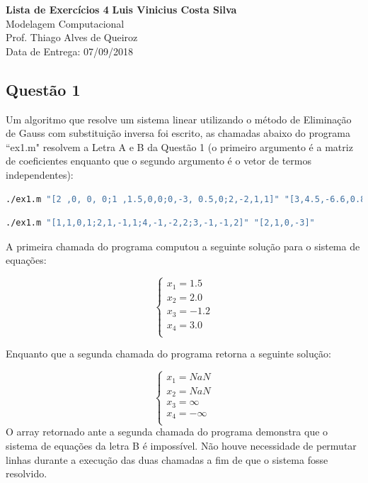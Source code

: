 \documentclass[a4paper, 11pt]{article}
\begin{document}
\noindent
\large\textbf{Lista de Exercícios 4} \hfill \textbf{Luis Vinicius Costa Silva} \\
\normalsize Modelagem Computacional \\
Prof. Thiago Alves de Queiroz \\
\hfill Data de Entrega: 07/09/2018

\subsection*{Questão 1}
Um algoritmo que resolve um sistema linear utilizando o método de Eliminação de Gauss com substituição inversa foi escrito, as chamadas abaixo do programa ``ex1.m" resolvem a Letra A e B da 
Questão 1 (o primeiro argumento é a matriz de coeficientes enquanto que o segundo argumento é o vetor de termos independentes):

\begin{lstlisting}[language=bash]
./ex1.m "[2 ,0, 0, 0;1 ,1.5,0,0;0,-3, 0.5,0;2,-2,1,1]" "[3,4.5,-6.6,0.8]"
\end{lstlisting}

\begin{lstlisting}[language=bash]
./ex1.m "[1,1,0,1;2,1,-1,1;4,-1,-2,2;3,-1,-1,2]" "[2,1,0,-3]"
\end{lstlisting}

A primeira chamada do programa computou a seguinte solução para o sistema de equações:

$$
\left\{\begin{matrix}
x_1 = 1.5\\ 
x_2 = 2.0\\ 
x_3 = -1.2\\ 
x_4 = 3.0 \\ 
\end{matrix}\right.
$$

Enquanto que a segunda chamada do programa retorna a seguinte solução:

$$
\left\{\begin{matrix}
x_1 = NaN\\ 
x_2 = NaN\\ 
x_3 = \infty\\ 
x_4 = -\infty \\ 
\end{matrix}\right.
$$
O array retornado ante a segunda chamada do programa demonstra que o sistema de equações da letra B é impossível. Não houve necessidade de permutar linhas durante a execução das duas chamadas a fim de que o sistema fosse resolvido.
\end{document}
